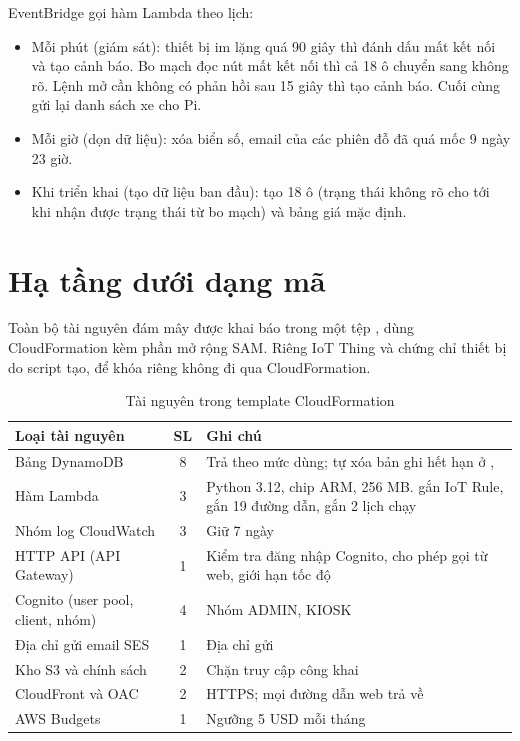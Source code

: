 EventBridge gọi hàm Lambda  theo lịch:

\begin{itemize}
  \item Mỗi phút (giám sát): thiết bị im lặng quá 90 giây thì đánh dấu mất kết nối và tạo cảnh báo. Bo mạch đọc nút mất kết nối thì cả 18 ô chuyển sang không rõ. Lệnh mở cần không có phản hồi sau 15 giây thì tạo cảnh báo. Cuối cùng gửi lại danh sách xe cho Pi.
  \item Mỗi giờ (dọn dữ liệu): xóa biển số, email của các phiên đỗ đã quá mốc 9 ngày 23 giờ.
  \item Khi triển khai (tạo dữ liệu ban đầu): tạo 18 ô (trạng thái không rõ cho tới khi nhận được trạng thái từ bo mạch) và bảng giá mặc định.
\end{itemize}

\section{Hạ tầng dưới dạng mã}

Toàn bộ tài nguyên đám mây được khai báo trong một tệp , dùng CloudFormation kèm phần mở rộng SAM. Riêng IoT Thing và chứng chỉ thiết bị do script tạo, để khóa riêng không đi qua CloudFormation.

\begin{table}[H]
\centering
\caption{Tài nguyên trong template CloudFormation}
\label{tab:tainguyen}
\begin{tabularx}{\textwidth}{@{}P{5.2cm}cL@{}}
\toprule
\textbf{Loại tài nguyên} & \textbf{SL} & \textbf{Ghi chú} \\ \midrule
Bảng DynamoDB & 8 & Trả theo mức dùng; tự xóa bản ghi hết hạn ở ,  \\
Hàm Lambda & 3 & Python 3.12, chip ARM, 256 MB.  gắn IoT Rule,  gắn 19 đường dẫn,  gắn 2 lịch chạy \\
Nhóm log CloudWatch & 3 & Giữ 7 ngày \\
HTTP API (API Gateway) & 1 & Kiểm tra đăng nhập Cognito, cho phép gọi từ web, giới hạn tốc độ \\
Cognito (user pool, client, nhóm) & 4 & Nhóm ADMIN, KIOSK \\
Địa chỉ gửi email SES & 1 & Địa chỉ gửi \\
Kho S3 và chính sách & 2 & Chặn truy cập công khai \\
CloudFront và OAC & 2 & HTTPS; mọi đường dẫn web trả về  \\
AWS Budgets & 1 & Ngưỡng 5 USD mỗi tháng \\
\bottomrule
\end{tabularx}
\end{table}
